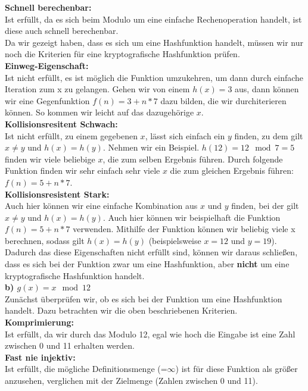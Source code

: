\documentclass[german]{../uebung}
\begin{document}
\begin{exercise}{1}
    \textbf{Schnell berechenbar:}\\
    Ist erfüllt, da es sich beim Modulo um eine einfache Rechenoperation handelt, ist diese auch schnell berechenbar.\\
    Da wir gezeigt haben, dass es sich um eine Hashfunktion handelt, müssen wir nur noch die Kriterien für eine kryptografische Hashfunktion prüfen.\\
    \textbf{Einweg-Eigenschaft:}\\
    Ist nicht erfüllt, es ist möglich die Funktion umzukehren, um dann durch einfache Iteration zum x zu gelangen. Gehen wir von einem \(h(x)=3\) aus, dann können wir eine Gegenfunktion \(f(n)=3+n*7\) dazu bilden, die wir durchiterieren können. So kommen wir leicht auf das dazugehörige \(x\).\\
    \textbf{Kollisionsresitent Schwach:}\\
    Ist nicht erfüllt, zu einem gegebenen \(x\), lässt sich einfach ein \(y\) finden, zu dem gilt \(x \neq y\) und \(h(x)=h(y)\). Nehmen wir ein Beispiel. \(h(12)=12 \mod 7= 5\) finden wir viele beliebige \(x\), die zum selben Ergebnis führen. Durch folgende Funktion finden wir sehr einfach sehr viele \(x\) die zum gleichen Ergebnis führen: \(f(n)=5+n*7\).\\
    \textbf{Kollisionsresistent Stark:}\\
    Auch hier können wir eine einfache Kombination aus \(x\) und \(y\) finden, bei der gilt \(x \neq y\) und \(h(x)=h(y)\). Auch hier können wir beispielhaft die Funktion \(f(n)=5+n*7\) verwenden. Mithilfe der Funktion können wir beliebig viele x berechnen, sodass gilt \(h(x)=h(y)\) (beispielsweise \(x=12\) und \(y=19\)).\\
    Dadurch das diese Eigenschaften nicht erfüllt sind, können wir daraus schließen, dass es sich bei der Funktion zwar um eine Hashfunktion, aber \textbf{nicht} um eine kryptografische Hashfunktion handelt.\\
    \textbf{b) \(g(x) = x \mod 12\)}\\
    Zunächst überprüfen wir, ob es sich bei der Funktion um eine Hashfunktion handelt. Dazu betrachten wir die oben beschriebenen Kriterien.\\
    \textbf{Komprimierung:}\\
    Ist erfüllt, da wir durch das Modulo 12, egal wie hoch die Eingabe ist eine Zahl zwischen 0 und 11 erhalten werden.\\
    \textbf{Fast nie injektiv:}\\
    Ist erfüllt, die mögliche Definitionsmenge (=\(\infty\)) ist für diese Funktion als größer anzusehen, verglichen mit der Zielmenge (Zahlen zwischen 0 und 11).\\

\end{exercise}
\end{document}
